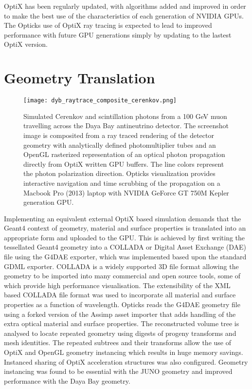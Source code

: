 \documentclass[a4paper]{jpconf}
\begin{document}
OptiX has been regularly updated, with algorithms added and improved in order 
to make the best use of the characteristics of each generation of NVIDIA GPUs. 
The Opticks use of OptiX ray tracing is expected to lead to improved performance
with future GPU generations simply by updating to the lastest OptiX version. 


\section{Geometry Translation}

\begin{figure}[htbp]
\centering
%
\texttt{[image: dyb\_raytrace\_composite\_cerenkov.png]}
%
%
\caption{
Simulated Cerenkov and scintillation photons from a 100 GeV muon travelling
across the Daya Bay antineutrino detector. The screenshot image is composited from 
a ray traced rendering of the detector geometry with analytically defined photomultiplier tubes 
and an OpenGL rasterized representation of an optical photon propagation directly from OptiX written GPU buffers. 
The line colors represent the photon polarization direction. Opticks visualization
provides interactive navigation and time scrubbing of the propagation on a 
Macbook Pro (2013) laptop with NVIDIA GeForce GT 750M Kepler generation GPU.
}
\end{figure}

Implementing an equivalent external OptiX based simulation demands that the Geant4 
context of geometry, material and surface properties is translated into 
an appropriate form and uploaded to the GPU.
This is achieved by first writing the tessellated Geant4 geometry into a 
COLLADA or Digital Asset Exchange (DAE) file using the G4DAE\cite{g4daeURL} exporter, 
which was implemented based upon the standard GDML exporter. 
COLLADA is a widely supported 3D file format allowing the geometry 
to be imported into many commercial and open source tools, some 
of which provide high performance visualisation.
The extensibility of the XML based COLLADA file format was used to 
incorporate all material and surface properties as a function of wavelength.
Opticks reads the G4DAE geometry file using a forked version\cite{AssimpFork} of the
Assimp\cite{Assimp} asset importer that adds handling of the extra optical material and surface
properties. 
The reconstructed volume tree is analysed to locate repeated geometry using digests 
of progeny transforms and mesh identities. The repeated subtrees and their transforms  
allow the use of OptiX and OpenGL geometry instancing which results in huge memory 
savings. Instanced sharing of OptiX acceleration structures was also configured. 
Geometry instancing was found to be essential with the JUNO geometry and improved performance
with the Daya Bay geometry.
\end{document}
